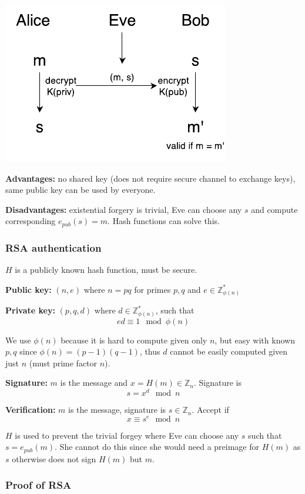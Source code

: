 \begin{center}
\includegraphics{images/2-pub-AB.pdf}
\end{center}

\textbf{Advantages:} no shared key (does not require secure channel to exchange keys), same public key can be used by everyone.

\textbf{Disadvantages:} existential forgery is trivial, Eve can choose any $s$ and compute corresponding $e_{pub}(s) = m$. Hash functions can solve this.

\subsubsection{RSA authentication}
$H$ is a publicly known hash function, must be secure.

\textbf{Public key:} $(n, e)$ where $n = pq$ for primes $p, q$ and $e \in \mathbb{Z}_{\phi(n)}^*$

\textbf{Private key:} $(p, q, d)$ where $d \in \mathbb{Z}_{\phi(n)}^*$, such that
\[ ed \equiv 1 \mod \phi(n) \]

We use $\phi(n)$ because it is hard to compute given only $n$, but easy with known $p, q$ since $\phi(n) = (p-1)(q-1)$, thus $d$ cannot be easily computed given just $n$ (must prime factor $n$).

\textbf{Signature:} $m$ is the message and $x = H(m) \in \mathbb{Z}_n$. Signature is
\[ s = x^d \mod n \]

\textbf{Verification:} $m$ is the message, signature is $s \in \mathbb{Z}_n$. Accept if
\[ x \equiv s^e \mod n \]

$H$ is used to prevent the trivial forgey where Eve can choose any $s$ such that $s = e_{pub}(m)$. She cannot do this since she would need a preimage for $H(m)$ as $s$ otherwise does not sign $H(m)$ but $m$.

\subsubsection{Proof of RSA}
